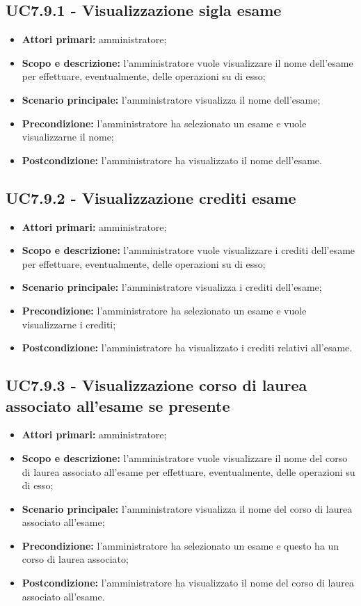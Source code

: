 \documentclass[AnalisiDeiRequisiti.tex]{subfiles}
\begin{document}
\subsection{UC7.9.1 - Visualizzazione sigla esame}
\begin{itemize}
	\item \textbf{Attori primari:} amministratore;
	\item \textbf{Scopo e descrizione:} l'amministratore vuole visualizzare il nome dell'esame per effettuare, eventualmente, delle operazioni su di esso;
	\item \textbf{Scenario principale:} l'amministratore visualizza il nome dell'esame;
	\item \textbf{Precondizione:} l'amministratore ha selezionato un esame e vuole visualizzarne il nome; 
	\item \textbf{Postcondizione:} l'amministratore ha visualizzato il nome dell'esame.
\end{itemize}
\subsection{UC7.9.2 - Visualizzazione crediti esame}
\begin{itemize}
	\item \textbf{Attori primari:} amministratore;
	\item \textbf{Scopo e descrizione:} l'amministratore vuole visualizzare i crediti dell'esame per effettuare, eventualmente, delle operazioni su di esso;
	\item \textbf{Scenario principale:} l'amministratore visualizza i crediti dell'esame;
	\item \textbf{Precondizione:} l'amministratore ha selezionato un esame e vuole visualizzarne i crediti; 
	\item \textbf{Postcondizione:} l'amministratore ha visualizzato i crediti relativi all'esame.
\end{itemize}
\subsection{UC7.9.3 - Visualizzazione corso di laurea associato all'esame se presente}
\begin{itemize}
	\item \textbf{Attori primari:} amministratore;
	\item \textbf{Scopo e descrizione:} l'amministratore vuole visualizzare il nome del corso di laurea associato all'esame per effettuare, eventualmente, delle operazioni su di esso;
	\item \textbf{Scenario principale:} l'amministratore visualizza il nome del corso di laurea associato all'esame;
	\item \textbf{Precondizione:} l'amministratore ha selezionato un esame e questo ha un corso di laurea associato; 
	\item \textbf{Postcondizione:} l'amministratore ha visualizzato il nome del corso di laurea associato all'esame.
\end{itemize}
\end{document}
